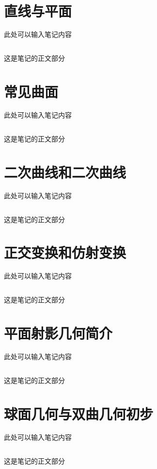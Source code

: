 \documentclass[12pt,a4paper,oneside]{ctexbook}
\begin{document}
\chapter{直线与平面}

此处可以输入笔记内容

\section{}

这是笔记的正文部分

\chapter{常见曲面}

此处可以输入笔记内容

\section{}

这是笔记的正文部分

\chapter{二次曲线和二次曲线}

此处可以输入笔记内容

\section{}

这是笔记的正文部分

\chapter{正交变换和仿射变换}

此处可以输入笔记内容

\section{}

这是笔记的正文部分

\chapter{平面射影几何简介}

此处可以输入笔记内容

\section{}

这是笔记的正文部分

\chapter{球面几何与双曲几何初步}

此处可以输入笔记内容

\section{}

这是笔记的正文部分
\end{document}
